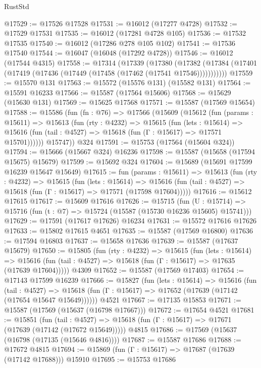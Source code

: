 \begin{lexlean}{RustStd}
\begin{coremodule}
@17529 := @17526 @17528
@17531 := @16012 (@17277 @4728)
@17532 := @17529 @17531
@17535 := @16012 (@17281 @4728 @105)
@17536 := @17532 @17535
@17540 := @16012 (@17286 @278 @105 @102)
@17541 := @17536 @17540
@17544 := @16047 (@16048 (@17292 @4728))
@17546 := @16012 (@17544 @4315)
@17558 := @17314
    (@17339
      (@17380
        (@17382 (@17384 (@17401 (@17419 (@17436 (@17449 (@17458 (@17462 (@17541 @17546)))))))))))
@17559 := @15570 @131
@17563 := @15572 (@15576 @131) (@15582 @131)
@17564 := @15591 @16233
@17566 := @15587 (@17564 @15606)
@17568 := @15629 (@15630 @131)
@17569 := @15625 @17568
@17571 := @15587 (@17569 @15654)
@17588 := @15586
    (fun (fn : @76) =>
    @17566
      (@15609
        (@15612
          (fun (params : @15611) =>
          @15613
            (fun (rty : @4232) =>
            @15615
              (fun (lets : @15614) =>
              @15616 (fun (tail : @4527) => @15618 (fun (Γ : @15617) => @17571 @15701))))))
        @15747))
    @324
@17591 := @15753 (@17564 (@15604 @324))
@17594 := @15666 (@15667 @324) @16236
@17598 := @15587 (@15658 (@17594 @15675) @15679)
@17599 := @15692 @324
@17604 := @15689 (@15691 @17599 @16239 @15647 @15649)
@17615 := fun (params : @15611) =>
  @15613
    (fun (rty : @4232) =>
    @15615
      (fun (lets : @15614) =>
      @15616 (fun (tail : @4527) => @15618 (fun (Γ : @15617) => @17571 (@17598 @17604)))))
@17616 := @15612 @17615
@17617 := @15609 @17616
@17626 := @15715
    (fun (U : @15714) => @15716 (fun (t : @7) => @15724 (@15587 (@15730 @16236 @15605) @15741)))
@17629 := @17591 (@17617 @17626) @16234
@17631 := @15572 @17616 @17626
@17633 := @15802 @17615 @4651
@17635 := @15587 (@17569 @16800)
@17636 := @17594 @16803
@17637 := @15658 @17636
@17639 := @15587 (@17637 @15679)
@17650 := @15805
    (fun (rty : @4232) =>
    @15615
      (fun (lets : @15614) =>
      @15616 (fun (tail : @4527) => @15618 (fun (Γ : @15617) => @17635 (@17639 @17604)))))
    @4309
@17652 := @15587 (@17569 @17403)
@17654 := @17143 @17599 @16239
@17666 := @15827
    (fun (lets : @15614) =>
    @15616
      (fun (tail : @4527) =>
      @15618 (fun (Γ : @15617) => @17652 (@17639 (@17142 (@17654 @15647 @15649))))))
    @4521
@17667 := @17135 @15853
@17671 := @15587 (@17569 (@15637 (@16798 @17667)))
@17672 := @17654 @4521
@17681 := @15851
    (fun (tail : @4527) => @15618 (fun (Γ : @15617) => @17671 (@17639 (@17142 (@17672 @15649)))))
    @4815
@17686 := @17569 (@15637 (@16798 (@17135 (@15646 @4816))))
@17687 := @15587 @17686
@17688 := @17672 @4815
@17694 := @15869 (fun (Γ : @15617) => @17687 (@17639 (@17142 @17688))) @15910
@17695 := @15753 @17686

\end{coremodule}
\end{lexlean}
